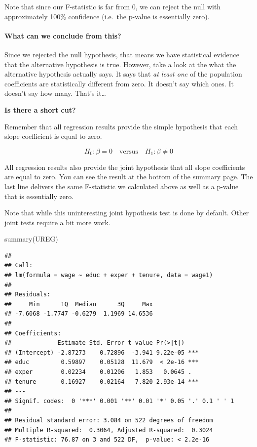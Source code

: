 \documentclass[
]{book}
\newenvironment{Shaded}{\begin{snugshade}}{\end{snugshade}}
\newcommand{\FunctionTok}[1]{\textcolor[rgb]{0.00,0.00,0.00}{#1}}
\newcommand{\NormalTok}[1]{#1}
\begin{document}
Note that since our F-statistic is far from 0, we can reject the null with approximately 100\% confidence (i.e.~the p-value is essentially zero).

\hypertarget{what-can-we-conclude-from-this}{%
\paragraph*{What can we conclude from this?}\label{what-can-we-conclude-from-this}}

Since we rejected the null hypothesis, that means we have statistical evidence that the alternative hypothesis is true. However, take a look at the what the alternative hypothesis actually says. It says that \emph{at least one} of the population coefficients are statistically different from zero. It doesn't say which ones. It doesn't say how many. That's it\ldots{}

\textbf{Is there a short cut?}

Remember that all regression results provide the simple hypothesis that each slope coefficient is equal to zero.

\[H_0: \beta=0 \quad \text{versus} \quad H_1: \beta \neq 0\]

All regression results also provide the joint hypothesis that all slope coefficients are equal to zero. You can see the result at the bottom of the summary page. The last line delivers the same F-statistic we calculated above as well as a p-value that is essentially zero.

Note that while this uninteresting joint hypothesis test is done by default. Other joint tests require a bit more work.

\begin{Shaded}
\begin{Highlighting}[]
\FunctionTok{summary}\NormalTok{(UREG)}
\end{Highlighting}
\end{Shaded}

\begin{verbatim}
## 
## Call:
## lm(formula = wage ~ educ + exper + tenure, data = wage1)
## 
## Residuals:
##     Min      1Q  Median      3Q     Max 
## -7.6068 -1.7747 -0.6279  1.1969 14.6536 
## 
## Coefficients:
##             Estimate Std. Error t value Pr(>|t|)    
## (Intercept) -2.87273    0.72896  -3.941 9.22e-05 ***
## educ         0.59897    0.05128  11.679  < 2e-16 ***
## exper        0.02234    0.01206   1.853   0.0645 .  
## tenure       0.16927    0.02164   7.820 2.93e-14 ***
## ---
## Signif. codes:  0 '***' 0.001 '**' 0.01 '*' 0.05 '.' 0.1 ' ' 1
## 
## Residual standard error: 3.084 on 522 degrees of freedom
## Multiple R-squared:  0.3064, Adjusted R-squared:  0.3024 
## F-statistic: 76.87 on 3 and 522 DF,  p-value: < 2.2e-16
\end{verbatim}
\end{document}
